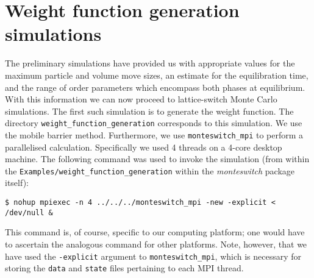 \documentclass{report}
\begin{document}
\section{Weight function generation simulations}\label{sec:example_generation}
The preliminary simulations have provided us with appropriate values for the maximum particle and volume move sizes, an estimate for
the equilibration time, and the range of order parameters which encompass both phases at equilibrium. With this information we can
now proceed to lattice-switch Monte Carlo simulations. The first such simulation is to generate the weight function. The directory
\texttt{weight\_function\_generation} corresponds to this simulation. We use the mobile barrier method. Furthermore, we use \texttt{monteswitch\_mpi}
to perform a parallelised calculation. Specifically we used 4 threads on a 4-core desktop machine. The following command was used
to invoke the simulation (from within the \texttt{Examples/weight\_function\_generation} within the \emph{monteswitch} package itself):
\begin{verbatim}
$ nohup mpiexec -n 4 ../../../monteswitch_mpi -new -explicit < 
/dev/null &
\end{verbatim}
This command is, of course, specific to our computing platform; one would have to ascertain the analogous command for other platforms. Note, however,
that we have used the \texttt{-explicit} argument to \texttt{monteswitch\_mpi}, which is necessary for storing the \texttt{data} and \texttt{state} 
files pertaining to each MPI thread.
\end{document}
